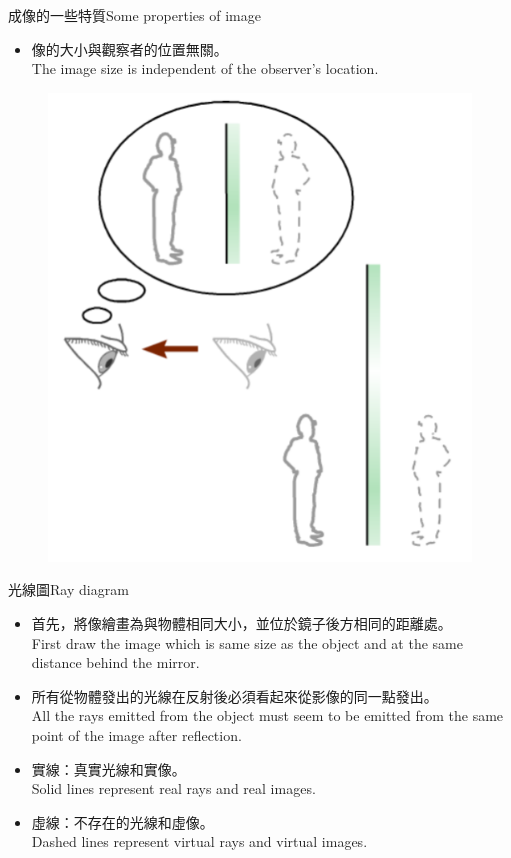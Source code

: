 \documentclass[beamer=true]{standalone}
\begin{document}
\begin{frame}{成像的一些特質Some properties of image}
\begin{itemize}
    \item 像的大小與觀察者的位置無關。\\The image size is independent of the observer's location.
\end{itemize}
\bigskip
\begin{figure}
    \centering
    \includegraphics[width=0.35\linewidth]{assets/dqwdoji1j8n9d1u983d.png}
    
    
\end{figure}
\end{frame}





\begin{frame}{光線圖Ray diagram}
\begin{itemize}
    \item 首先，將像繪畫為與物體相同大小，並位於鏡子後方相同的距離處。\\First draw the image which is same size as the object and at the same distance behind the mirror.
    \item 所有從物體發出的光線在反射後必須看起來從影像的同一點發出。\\All the rays emitted from the object must seem to be emitted from the same point of the image after reflection.
\end{itemize}
    \begin{itemize}
        \item 實線：真實光線和實像。\\ Solid lines represent real rays and real images.
        \item 虛線：不存在的光線和虛像。\\ Dashed lines represent virtual rays and virtual images.
    \end{itemize}
    
\end{frame}
\end{document}
